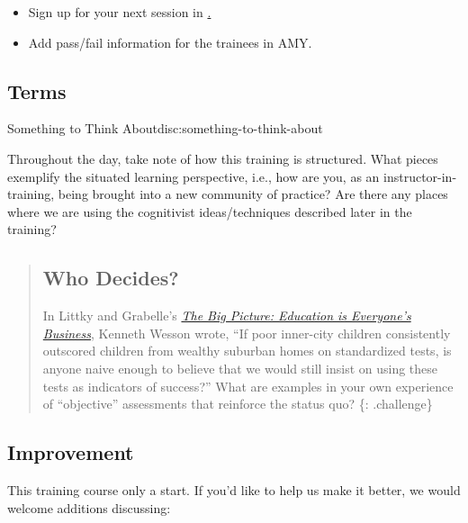 \begin{itemize}
\item
  Sign up for your next session in
  \href{http://pad.software-carpentry.org/teaching-demos}.
\item
  Add pass/fail information for the trainees in AMY.
\end{itemize}

\subsection{Terms}\label{terms}

\begin{discussion}{Something to Think About}{disc:something-to-think-about}

Throughout the day, take note of how this training is structured. What
pieces exemplify the situated learning perspective, i.e., how are you,
as an instructor-in-training, being brought into a new community of
practice? Are there any places where we are using the cognitivist
ideas/techniques described later in the training?
\end{discussion}

\begin{quote}
\subsection{Who Decides?}\label{who-decides}

In Littky and Grabelle's
\emph{\href{http://www.amazon.com/Big-Picture-Education-Everyones-Business/dp/0871209713/}{The
Big Picture: Education is Everyone's Business}}, Kenneth Wesson wrote,
``If poor inner-city children consistently outscored children from
wealthy suburban homes on standardized tests, is anyone naive enough to
believe that we would still insist on using these tests as indicators of
success?'' What are examples in your own experience of ``objective''
assessments that reinforce the status quo? \{: .challenge\}
\end{quote}

\subsection{Improvement}

This training course only a start. If you'd like to help us make it
better, we would welcome additions discussing:

